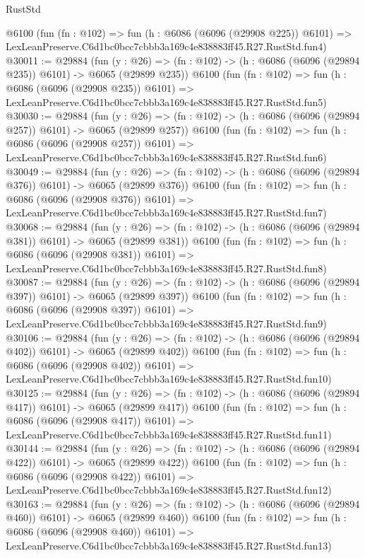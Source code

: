 \begin{lexlean}{RustStd}
\begin{coremodule}
    @6100
    (fun (fn : @102) =>
    fun (h : @6086 (@6096 (@29908 @225)) @6101) =>
    LexLeanPreserve.C6d1bc0bcc7cbbb3a169c4e838883ff45.R27.RustStd.fun4)
@30011 := @29884
    (fun (y : @26) => (fn : @102) -> (h : @6086 (@6096 (@29894 @235)) @6101) -> @6065 (@29899 @235))
    @6100
    (fun (fn : @102) =>
    fun (h : @6086 (@6096 (@29908 @235)) @6101) =>
    LexLeanPreserve.C6d1bc0bcc7cbbb3a169c4e838883ff45.R27.RustStd.fun5)
@30030 := @29884
    (fun (y : @26) => (fn : @102) -> (h : @6086 (@6096 (@29894 @257)) @6101) -> @6065 (@29899 @257))
    @6100
    (fun (fn : @102) =>
    fun (h : @6086 (@6096 (@29908 @257)) @6101) =>
    LexLeanPreserve.C6d1bc0bcc7cbbb3a169c4e838883ff45.R27.RustStd.fun6)
@30049 := @29884
    (fun (y : @26) => (fn : @102) -> (h : @6086 (@6096 (@29894 @376)) @6101) -> @6065 (@29899 @376))
    @6100
    (fun (fn : @102) =>
    fun (h : @6086 (@6096 (@29908 @376)) @6101) =>
    LexLeanPreserve.C6d1bc0bcc7cbbb3a169c4e838883ff45.R27.RustStd.fun7)
@30068 := @29884
    (fun (y : @26) => (fn : @102) -> (h : @6086 (@6096 (@29894 @381)) @6101) -> @6065 (@29899 @381))
    @6100
    (fun (fn : @102) =>
    fun (h : @6086 (@6096 (@29908 @381)) @6101) =>
    LexLeanPreserve.C6d1bc0bcc7cbbb3a169c4e838883ff45.R27.RustStd.fun8)
@30087 := @29884
    (fun (y : @26) => (fn : @102) -> (h : @6086 (@6096 (@29894 @397)) @6101) -> @6065 (@29899 @397))
    @6100
    (fun (fn : @102) =>
    fun (h : @6086 (@6096 (@29908 @397)) @6101) =>
    LexLeanPreserve.C6d1bc0bcc7cbbb3a169c4e838883ff45.R27.RustStd.fun9)
@30106 := @29884
    (fun (y : @26) => (fn : @102) -> (h : @6086 (@6096 (@29894 @402)) @6101) -> @6065 (@29899 @402))
    @6100
    (fun (fn : @102) =>
    fun (h : @6086 (@6096 (@29908 @402)) @6101) =>
    LexLeanPreserve.C6d1bc0bcc7cbbb3a169c4e838883ff45.R27.RustStd.fun10)
@30125 := @29884
    (fun (y : @26) => (fn : @102) -> (h : @6086 (@6096 (@29894 @417)) @6101) -> @6065 (@29899 @417))
    @6100
    (fun (fn : @102) =>
    fun (h : @6086 (@6096 (@29908 @417)) @6101) =>
    LexLeanPreserve.C6d1bc0bcc7cbbb3a169c4e838883ff45.R27.RustStd.fun11)
@30144 := @29884
    (fun (y : @26) => (fn : @102) -> (h : @6086 (@6096 (@29894 @422)) @6101) -> @6065 (@29899 @422))
    @6100
    (fun (fn : @102) =>
    fun (h : @6086 (@6096 (@29908 @422)) @6101) =>
    LexLeanPreserve.C6d1bc0bcc7cbbb3a169c4e838883ff45.R27.RustStd.fun12)
@30163 := @29884
    (fun (y : @26) => (fn : @102) -> (h : @6086 (@6096 (@29894 @460)) @6101) -> @6065 (@29899 @460))
    @6100
    (fun (fn : @102) =>
    fun (h : @6086 (@6096 (@29908 @460)) @6101) =>
    LexLeanPreserve.C6d1bc0bcc7cbbb3a169c4e838883ff45.R27.RustStd.fun13)

\end{coremodule}
\end{lexlean}
